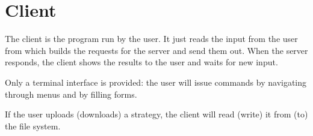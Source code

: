 \section{Client}\label{sec:client}

The client is the program run by the user. It just reads the input from the
user from which builds the requests for the server and send them out. When the
server responds, the client shows the results to the user and waits for new
input.

Only a terminal interface is provided: the user will issue commands by
navigating through menus and by filling forms.

If the user uploads (downloads) a strategy, the client will read (write) it from
(to) the file system.
